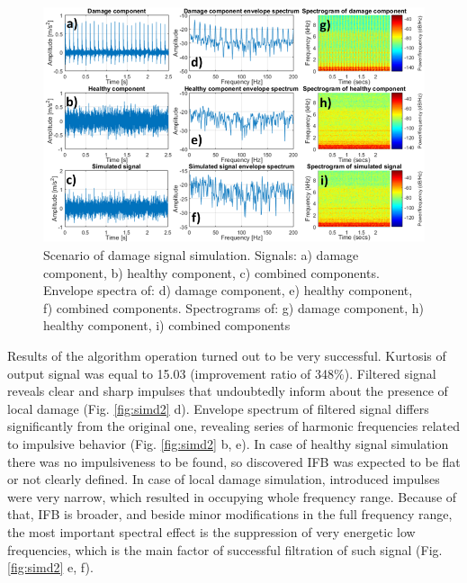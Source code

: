 \documentclass[preprint,12pt]{elsarticle}
\begin{document}
\begin{figure}[ht!]
\centering
\includegraphics[width=1\textwidth]{wykresy/simd1.png}
\caption{Scenario of damage signal simulation. Signals: a) damage component, b) healthy component, c) combined components. Envelope spectra of: d) damage component, e) healthy component, f) combined components. Spectrograms of: g) damage component, h) healthy component, i) combined components}
\label{fig:simd1}
\end{figure}

Results of the algorithm operation turned out to be very successful. Kurtosis of output signal was equal to 15.03 (improvement ratio of 348$\%$). Filtered signal reveals clear and sharp impulses that undoubtedly inform about the presence of local damage (Fig. \ref{fig:simd2} d). Envelope spectrum of filtered signal differs significantly from the original one, revealing series of harmonic frequencies related to impulsive behavior (Fig. \ref{fig:simd2} b, e). In case of healthy signal simulation there was no impulsiveness to be found, so discovered IFB was expected to be flat or not clearly defined. In case of local damage simulation, introduced impulses were very narrow, which resulted in occupying whole frequency range. Because of that, IFB is broader, and beside minor modifications in the full frequency range, the most important spectral effect is the suppression of very energetic low frequencies, which is the main factor of successful filtration of such signal (Fig. \ref{fig:simd2} e, f).
\end{document}
